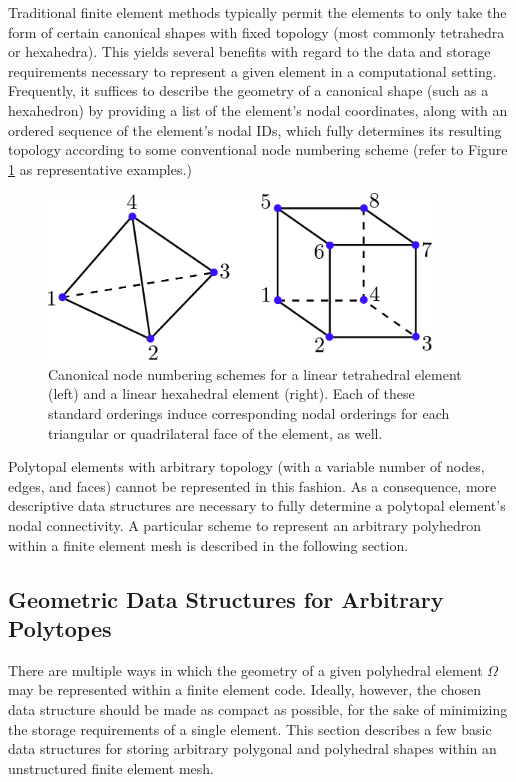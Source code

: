 	Traditional finite element methods typically permit the elements to only take the form of certain canonical shapes with fixed topology (most commonly tetrahedra or hexahedra). This yields several benefits with regard to the data and storage requirements necessary to represent a given element in a computational setting. Frequently, it suffices to describe the geometry of a canonical shape (such as a hexahedron) by providing a list of the element's nodal coordinates, along with an ordered sequence of the element's nodal IDs, which fully determines its resulting topology according to some conventional node numbering scheme (refer to Figure \ref{fig:canonical_orderings} as representative examples.)
	\begin{figure} [!ht]
		\centering
		\includegraphics[width = 4.0in]{figures/canonical_orderings.pdf}
		\caption{Canonical node numbering schemes for a linear tetrahedral element (left) and a linear hexahedral element (right). Each of these standard orderings induce corresponding nodal orderings for each triangular or quadrilateral face of the element, as well.}
		\label{fig:canonical_orderings}
	\end{figure}
	
	Polytopal elements with arbitrary topology (with a variable number of nodes, edges, and faces) cannot be represented in this fashion. As a consequence, more descriptive data structures are necessary to fully determine a polytopal element's nodal connectivity. A particular scheme to represent an arbitrary polyhedron within a finite element mesh is described in the following section.

\subsection*{Geometric Data Structures for Arbitrary Polytopes}

	There are multiple ways in which the geometry of a given polyhedral element $\Omega$ may be represented within a finite element code. Ideally, however, the chosen data structure should be made as compact as possible, for the sake of minimizing the storage requirements of a single element. This section describes a few basic data structures for storing arbitrary polygonal and polyhedral shapes within an unstructured finite element mesh.
	
